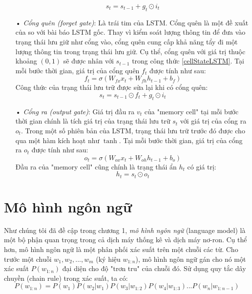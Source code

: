 \begin{itemize}
	\begin{equation} \label{cellStateLSTM}
		s_t = s_{t-1} + g_t \odot i_t
	\end{equation}
	\item[•] \textit{Cổng quên (forget gate)}: Là trái tim của LSTM. Cổng quên là một đề xuất của \cite{Gers2000} so với bài báo LSTM gốc. Thay vì kiểm soát lượng thông tin để đưa vào trạng thái lưu giữ như cổng vào, cổng quên cung cấp khả năng tẩy đi một lượng thông tin trong trạng thái lưu giữ. Cụ thể, cổng quên với giá trị thuộc khoảng $(0,1)$ sẽ được nhân với $s_{t-1}$ trong công thức \ref{cellStateLSTM}. Tại mỗi bước thời gian, giá trị của cổng quên $f_t$ được tính như sau:
	\begin{equation} \label{forgetGateLSTM}
		f_t = \sigma \left(W_{fx}x_t + W_{fh}h_{t-1} + b_f \right)
	\end{equation}
	Công thức của trạng thái lưu trữ được sửa lại khi có cổng quên:
	\begin{equation} \label{cellStateWithForgetGateLSTM}
		s_t = s_{t-1} \odot f_t + g_t \odot i_t
	\end{equation}
	\item[•] \textit{Cổng ra (output gate)}: Giá trị đầu ra $v_t$ của "memory cell" tại mỗi bước thời gian chính là tích giá trị của trạng thái lưu trữ $s_t$ với giá trị của cổng ra $o_t$. Trong một số phiên bản của LSTM, trạng thái lưu trữ trước đó được cho qua một hàm kích hoạt như $\tanh$. Tại mỗi bước thời gian, giá trị của cổng ra $o_t$ được tính như sau:
	\begin{equation} \label{outputGateLSTM}
		o_t = \sigma \left(W_{ox}x_t + W_{oh}h_{t-1} + b_o \right)
	\end{equation}
	Đầu ra của "memory cell" cũng chính là trạng thái ẩn $h_t$ có giá trị:
	\begin{equation} \label{outputNodeLSTM}
		h_t = s_t \odot o_t 
	\end{equation}
\end{itemize}



\section{Mô hình ngôn ngữ}

Như chúng tôi đã đề cập trong chương 1, \textit{mô hình ngôn ngữ} (language model) là một bộ phận quan trọng trong cả dịch máy thống kê và dịch máy nơ-ron. Cụ thể hơn, mô hình ngôn ngữ là một phân phối xác suất trên một chuỗi các từ. Cho trước một chuỗi $w_1,w_2,...,w_m$ (ký hiệu $w_{1:n}$), mô hình ngôn ngữ gán cho nó một xác suất $P(w_{1:n})$ đại diện cho độ "trơn tru" của chuỗi đó. Sử dụng quy tắc dây chuyền (chain rule) trong xác suất, ta có:
\begin{equation} \label{lmGeneral}
	P(w_{1:n}) = P(w_1)P(w_2|w_1)P(w_3|w_{1:2})P(w_4|w_{1:3})...P(w_n|w_{1:n-1})
\end{equation}














